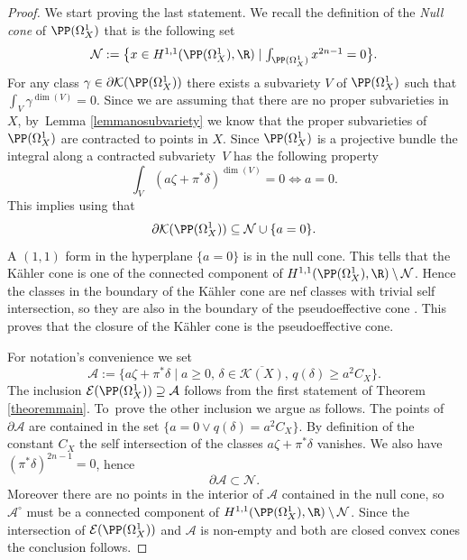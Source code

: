 \begin{proof}
We start proving the last statement.
We recall the definition of the \emph{Null cone} of $\PP(\Omega_X^1)$ that is the following set
\[\textstyle
\mathcal{N}:=\bigl\{x\in H^{1,1} (\PP(\Omega_X^1),\R) \mid \int_{\PP(\Omega_X^1)}x^{2n-1}=0 \bigr\}.
\]
For any class $\gamma \in \partial \mathcal{K}(\PP(\Omega_X^1))$ there exists a subvariety $V$ of $\PP(\Omega_X^1)$ such that $\int_V \gamma^{\dim(V)}=0$. Since we are assuming that there are no proper subvarieties in $X$, by~Lemma \ref{lemmanosubvariety} we know that the proper subvarieties of $\PP(\Omega_X^1)$ are contracted to points in $X$. Since $\PP(\Omega_X^1)$ is a projective bundle the integral along a contracted subvariety~$V$ has the following property
\[\int_V (a \zeta+\pi^*\delta)^{\dim(V)}=0\iff a=0.\]
This implies using \cite[Th.\,0.1]{DP04} that
\[\partial \mathcal{K}(\PP(\Omega_X^1))\subseteq \mathcal{N} \cup \{a=0\}.
\]
A $(1,1)$ form in the hyperplane $\{a=0\}$ is in the null cone. This tells that the Kähler cone is one of the connected component of $H^{1,1}(\PP(\Omega_X^1),\R)\setminus \mathcal{N}$. Hence the classes in the boundary of the Kähler cone are nef classes with trivial self intersection, so they are also in the boundary of the pseudoeffective cone \cite[Th.\,0.5]{DP04}. This proves that the closure of the Kähler cone is the pseudoeffective cone.

For notation's convenience we set
\[
\mathcal{A}:=\bigl\{ a\zeta+\pi^* \delta \mid a\geq 0,\, \delta\in \overline{\mathcal{K}(X)},\, q(\delta)\geq a^2 C_X \bigr\}.
\]
The inclusion $\mathcal{E}(\PP(\Omega_X^1)) \supseteq \mathcal{A}$ follows from the first
statement of Theorem \ref{theoremmain}.
To~prove the other inclusion we argue as follows. The points of $\partial \mathcal{A}$ are contained in the set $\{a=0 \vee q(\delta)= a^2 C_X \}$. By definition of the constant $C_X$ the self intersection of the classes $a \zeta+\pi^*\delta$ vanishes. We also have $(\pi^*\delta )^{2n-1}=0$, hence
\[\partial \mathcal{A} \subset \mathcal{N}.\]
Moreover there are no points in the interior of $\mathcal{A} $ contained in the null cone, so~$\mathcal{A}^{\circ} $ must be a connected component of $H^{1,1}(\PP(\Omega_X^1),\R)\setminus \mathcal{N}$. Since the intersection of $\mathcal{E}(\PP(\Omega_X^1))$ and $ \mathcal{A}$ is non-empty and both are closed convex cones the conclusion follows.
\end{proof}

